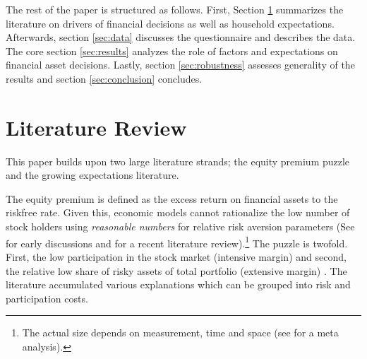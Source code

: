 \documentclass[ProjectABM]{subfiles}
\begin{document}
The rest of the paper is structured as follows. First, Section \ref{sec:literature} summarizes the literature on drivers of financial decisions as well as household expectations. Afterwards, section \ref{sec:data} discusses the questionnaire and describes the data. The core section \ref{sec:results} analyzes the role of factors and expectations on financial asset decisions. Lastly, section \ref{sec:robustness} assesses generality of the results and section \ref{sec:conclusion} concludes.


\section{Literature Review}\label{sec:literature}

This paper builds upon two large literature strands; the equity premium puzzle and the growing expectations literature.

The equity premium is defined as the excess return on financial assets to the riskfree rate. Given this, economic models cannot rationalize the low number of stock holders using \textit{reasonable numbers} for relative risk aversion parameters (See \cite{mehra_porescott_1985equity_premium, haliassos_bertraut_1995equity_premium} for early discussions and \cite{Gomes_et_al_2021} for a recent literature review).\footnote{ The actual size depends on measurement, time and space (see\cite{vanEwijk_et_al_2012meta_equity_premium} for a meta analysis).} The puzzle is twofold. First, the low participation in the stock market (intensive margin) and second, the relative low share of risky assets of total portfolio (extensive margin) \citep{campbell_2006household_finance}. The literature accumulated various explanations which can be grouped into risk and participation costs. %
\end{document}

